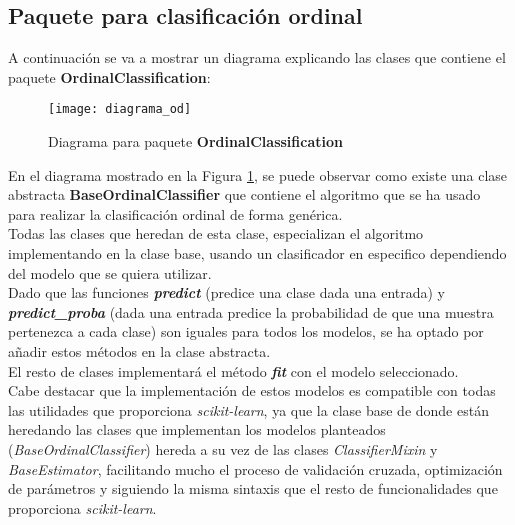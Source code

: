 \subsection{Paquete para clasificación ordinal}
\label{sec:sftw-ocl}
A continuación se va a mostrar un diagrama explicando las clases que contiene el paquete \textbf{OrdinalClassification}:
\begin{figure}[H]
    \centering
    \texttt{[image: diagrama\_od]}
    \caption{Diagrama para paquete \textbf{OrdinalClassification}}
    \label{dig:paquetes_od}
\end{figure}
En el diagrama mostrado en la Figura \ref{dig:paquetes_od}, se puede observar como existe una clase abstracta \textbf{BaseOrdinalClassifier} que contiene el algoritmo que se ha usado para realizar la clasificación ordinal de forma genérica. \\
Todas las clases que heredan de esta clase, especializan el algoritmo implementando en la clase base, usando un clasificador en especifico dependiendo del modelo que se quiera utilizar.\\
Dado que las funciones \textbf{\textit{predict}} (predice una clase dada una entrada) y \textbf{\textit{predict\_proba}} (dada una entrada predice la probabilidad de que una muestra pertenezca a cada clase) son iguales para todos los modelos, se ha optado por añadir estos métodos en la clase abstracta.\\
El resto de clases implementará el método \textbf{\textit{fit}} con el modelo seleccionado. \\
\linebreak
Cabe destacar que la implementación de estos modelos es compatible con todas las utilidades que proporciona \textit{scikit-learn}, ya que la clase base de donde están heredando las clases que implementan los modelos planteados (\textit{BaseOrdinalClassifier}) hereda a su vez de las clases \textit{ClassifierMixin} y \textit{BaseEstimator}, facilitando mucho el proceso de validación cruzada, optimización de parámetros y siguiendo la misma sintaxis que el resto de funcionalidades que proporciona \textit{scikit-learn}.
